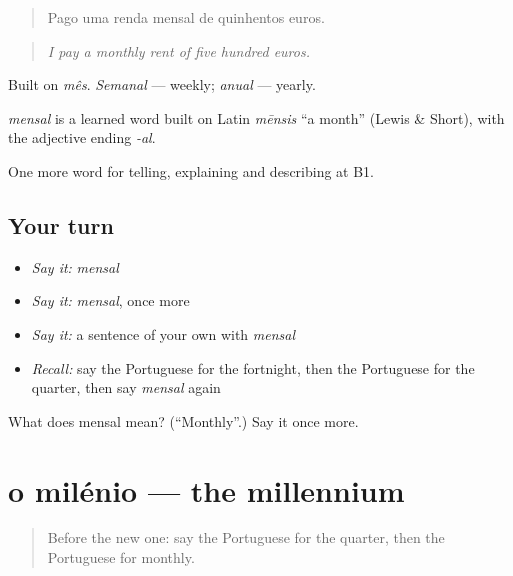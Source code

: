 \begin{quote}
Pago uma renda mensal de quinhentos euros.
\end{quote}

\begin{quote}
\emph{I pay a monthly rent of five hundred euros.}
\end{quote}

Built on \emph{mês}. \emph{Semanal} — weekly; \emph{anual} — yearly.

\begin{cousinweb}
\emph{mensal} is a learned word built on Latin \emph{mēnsis} \textquotedblleft{}a month\textquotedblright{} (Lewis \& Short), with the adjective ending \emph{-al}.
\end{cousinweb}

\begin{grammarlens}[title={What you've built}]
One more word for telling, explaining and describing at B1.
\end{grammarlens}

\subsection*{Your turn}
\begin{itemize}
\raggedright
  \item \emph{Say it:} \emph{mensal}
  \item \emph{Say it:} \emph{mensal}, once more
  \item \emph{Say it:} a sentence of your own with \emph{mensal}
  \item \emph{Recall:} say the Portuguese for the fortnight, then the Portuguese for the quarter, then say \emph{mensal} again
\end{itemize}

\begin{tcolorbox}[breakable,colback=teal!4,colframe=teal!35!black,title={Before you move on}]
What does mensal mean? (\textquotedblleft{}Monthly\textquotedblright{}.) Say it once more.
\end{tcolorbox}
\section[o milénio]{o milénio — the millennium}

\label{lesson:PT-C276-milenio}



\begin{quote}
Before the new one: say the Portuguese for the quarter, then the Portuguese for monthly.
\end{quote}

